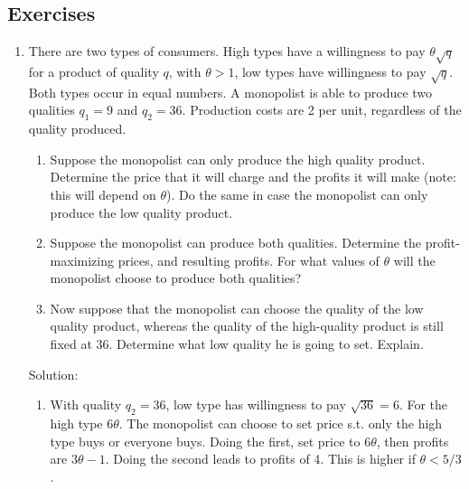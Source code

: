\subsection{Exercises}
\begin{enumerate}
	\item There are two types of consumers. High types have a willingness to pay $\theta\sqrt{q}$ for a
	      product of quality $q$, with $\theta > 1$, low types have willingness to pay $\sqrt{q}$. Both types
	      occur in equal numbers. A monopolist is able to produce two qualities $q_1 = 9$ and
	      $q_2 = 36$. Production costs are 2 per unit, regardless of the quality produced.
	      \begin{enumerate}
		      \item Suppose the monopolist can only produce the high quality product. Determine
		            the price that it will charge and the profits it will make (note: this will depend
		            on $\theta$). Do the same in case the monopolist can only produce the low quality
		            product.
		      \item Suppose the monopolist can produce both qualities. Determine the profit-
		            maximizing prices, and resulting profits. For what values of $\theta$ will the monopolist choose to produce both qualities?
		      \item Now suppose that the monopolist can choose the quality of the low quality
		            product, whereas the quality of the high-quality product is still fixed at 36.
		            Determine what low quality he is going to set. Explain.
	      \end{enumerate}

	      Solution:
	      \begin{enumerate}
		      \item With quality $q_2=36$, low type has willingness to pay $\sqrt{36}=6$.
		            For the high type $6\theta$. The monopolist can choose to set price s.t.
		            only the high type buys or everyone buys. Doing the first, set price to $6\theta$,
		            then profits are $3\theta-1$. Doing the second leads to profits of 4. This is higher if
		            $\theta<5/3$.


\end{enumerate}
\end{enumerate}

